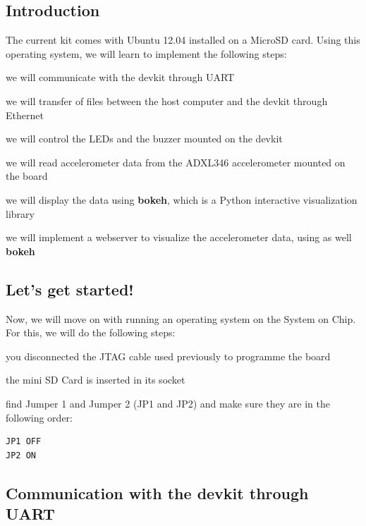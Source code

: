 \subsection{Introduction}

The current kit comes with Ubuntu 12.04 installed on a MicroSD card. Using this 
operating system, we will learn to implement the following steps:
\begin{myitemize}
\item we will communicate with the devkit through UART
\item we will transfer of files between the host computer and the devkit through Ethernet
\item we will control the LEDs and the buzzer mounted on the devkit
\item we will read accelerometer data from the ADXL346 accelerometer mounted on the board
\item we will display the data using \textbf{bokeh}, which is a Python interactive visualization library
\item we will implement a webserver to visualize the accelerometer data, using as well \textbf{bokeh}
\end{myitemize}



\subsection{Let's get started!}

Now, we will move on with running an operating system on the System on Chip. For this, we will do the following steps:
\begin{myitemize}
\item you disconnected the JTAG cable used previously to programme the board
\item the mini SD Card is inserted in its socket
\item find Jumper 1 and Jumper 2 (JP1 and JP2) and make sure they are in the following order:
\begin{verbatim}
JP1 OFF 
JP2 ON
\end{verbatim}
\end{myitemize}


\subsection{Communication with the devkit through UART}

